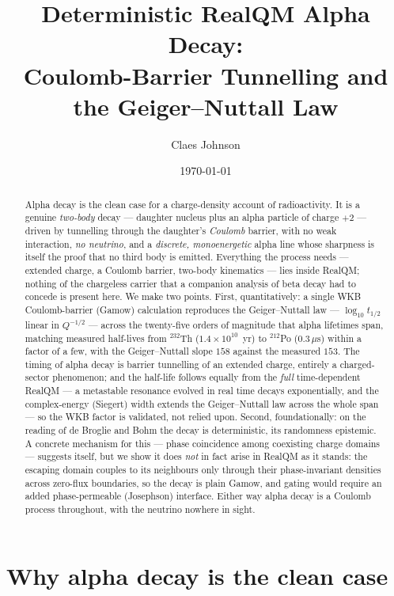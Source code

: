 \documentclass[11pt]{article}
\title{Deterministic RealQM Alpha Decay:\\
Coulomb-Barrier Tunnelling and the Geiger--Nuttall Law}
\author[1]{Claes Johnson}
\affil[1]{KTH Royal Institute of Technology, SE-100 44 Stockholm, Sweden \\
\texttt{claesjohnson@gmail.com}}
\date{\today}
\begin{document}
\maketitle

\begin{abstract}
Alpha decay is the clean case for a charge-density account of radioactivity. It is a genuine \emph{two-body}
decay --- daughter nucleus plus an alpha particle of charge $+2$ --- driven by tunnelling through the
daughter's \emph{Coulomb} barrier, with no weak interaction, \emph{no neutrino}, and a \emph{discrete,
monoenergetic} alpha line whose sharpness is itself the proof that no third body is emitted. Everything the
process needs --- extended charge, a Coulomb barrier, two-body kinematics --- lies inside RealQM; nothing of
the chargeless carrier that a companion analysis of beta decay had to concede is present here. We make two
points. First, quantitatively: a single WKB Coulomb-barrier (Gamow) calculation reproduces the
Geiger--Nuttall law --- $\log_{10}t_{1/2}$ linear in $Q^{-1/2}$ --- across the twenty-five orders of
magnitude that alpha lifetimes span, matching measured half-lives from $^{232}$Th ($1.4\times10^{10}$~yr) to
$^{212}$Po ($0.3\,\mu$s) within a factor of a few, with the Geiger--Nuttall slope $158$ against the measured
$153$. The timing of alpha decay is barrier tunnelling of an extended charge, entirely a charged-sector
phenomenon; and the half-life follows equally from the \emph{full} time-dependent RealQM --- a metastable
resonance evolved in real time decays exponentially, and the complex-energy (Siegert) width extends the
Geiger--Nuttall law across the whole span --- so the WKB factor is validated, not relied upon. Second,
foundationally: on the reading of de Broglie and Bohm the decay is deterministic, its randomness epistemic.
A concrete mechanism for this --- phase coincidence among coexisting charge domains --- suggests itself, but
we show it does \emph{not} in fact arise in RealQM as it stands: the escaping domain couples to its
neighbours only through their phase-invariant densities across zero-flux boundaries, so the decay is plain
Gamow, and gating would require an added phase-permeable (Josephson) interface. Either way alpha decay is a
Coulomb process throughout, with the neutrino nowhere in sight.
\end{abstract}


\section{Why alpha decay is the clean case}
\label{sec:clean}
\end{document}
